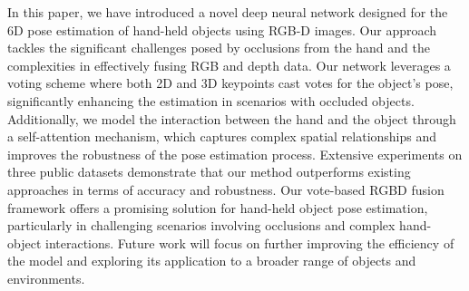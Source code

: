 In this paper, we have introduced a novel deep neural network designed for the 6D pose estimation of hand-held objects using RGB-D images. Our approach tackles the significant challenges posed by occlusions from the hand and the complexities in effectively fusing RGB and depth data.  Our network leverages a voting scheme where both 2D and 3D keypoints cast votes for the object's pose, significantly enhancing the estimation in scenarios with occluded objects. Additionally, we model the interaction between the hand and the object through a self-attention mechanism, which captures complex spatial relationships and improves the robustness of the pose estimation process. Extensive experiments on three public datasets demonstrate that our method outperforms existing approaches in terms of accuracy and robustness. Our vote-based RGBD fusion framework offers a promising solution for hand-held object pose estimation, particularly in challenging scenarios involving occlusions and complex hand-object interactions. Future work will focus on further improving the efficiency of the model and exploring its application to a broader range of objects and environments. \\